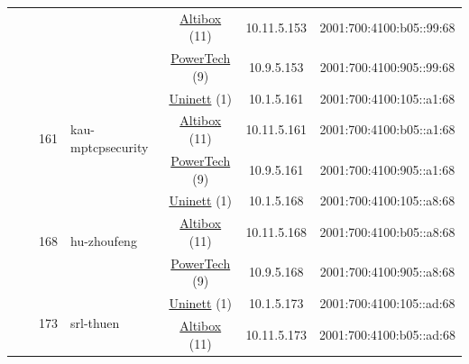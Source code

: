 \begin{small}
\begin{center}
\begin{longtable}{|c|c|c|c|c|c|c|c|}
  &  &  &  & \multicolumn{2}{|c|}{\tiny{\href{https://www.altibox.no}{Altibox} (11)}} & \tiny{10.11.5.153} & \tiny{2001:700:4100:b05::99:68} \\* \cline{5-5}\cline{6-6}\cline{7-7}\cline{8-8}
  &  &  &  & \multicolumn{2}{|c|}{\tiny{\href{http://www.powertech.no}{PowerTech} (9)}} & \tiny{10.9.5.153} & \tiny{2001:700:4100:905::99:68} \\* \cline{3-3}\cline{4-4}\cline{5-5}\cline{6-6}\cline{7-7}\cline{8-8}
  &  & \multirow{3}{*}{\tiny{161}} & \multicolumn{1}{|l|}{\multirow{3}{*}{\tiny{kau-mptcpsecurity}}} & \multicolumn{2}{|c|}{\tiny{\href{https://www.uninett.no}{Uninett} (1)}} & \tiny{10.1.5.161} & \tiny{2001:700:4100:105::a1:68} \\* \cline{5-5}\cline{6-6}\cline{7-7}\cline{8-8}
  &  &  &  & \multicolumn{2}{|c|}{\tiny{\href{https://www.altibox.no}{Altibox} (11)}} & \tiny{10.11.5.161} & \tiny{2001:700:4100:b05::a1:68} \\* \cline{5-5}\cline{6-6}\cline{7-7}\cline{8-8}
  &  &  &  & \multicolumn{2}{|c|}{\tiny{\href{http://www.powertech.no}{PowerTech} (9)}} & \tiny{10.9.5.161} & \tiny{2001:700:4100:905::a1:68} \\* \cline{3-3}\cline{4-4}\cline{5-5}\cline{6-6}\cline{7-7}\cline{8-8}
  &  & \multirow{3}{*}{\tiny{168}} & \multicolumn{1}{|l|}{\multirow{3}{*}{\tiny{hu-zhoufeng}}} & \multicolumn{2}{|c|}{\tiny{\href{https://www.uninett.no}{Uninett} (1)}} & \tiny{10.1.5.168} & \tiny{2001:700:4100:105::a8:68} \\* \cline{5-5}\cline{6-6}\cline{7-7}\cline{8-8}
  &  &  &  & \multicolumn{2}{|c|}{\tiny{\href{https://www.altibox.no}{Altibox} (11)}} & \tiny{10.11.5.168} & \tiny{2001:700:4100:b05::a8:68} \\* \cline{5-5}\cline{6-6}\cline{7-7}\cline{8-8}
  &  &  &  & \multicolumn{2}{|c|}{\tiny{\href{http://www.powertech.no}{PowerTech} (9)}} & \tiny{10.9.5.168} & \tiny{2001:700:4100:905::a8:68} \\* \cline{3-3}\cline{4-4}\cline{5-5}\cline{6-6}\cline{7-7}\cline{8-8}
  &  & \multirow{3}{*}{\tiny{173}} & \multicolumn{1}{|l|}{\multirow{3}{*}{\tiny{srl-thuen}}} & \multicolumn{2}{|c|}{\tiny{\href{https://www.uninett.no}{Uninett} (1)}} & \tiny{10.1.5.173} & \tiny{2001:700:4100:105::ad:68} \\* \cline{5-5}\cline{6-6}\cline{7-7}\cline{8-8}
  &  &  &  & \multicolumn{2}{|c|}{\tiny{\href{https://www.altibox.no}{Altibox} (11)}} & \tiny{10.11.5.173} & \tiny{2001:700:4100:b05::ad:68} \\* \cline{5-5}\cline{6-6}\cline{7-7}\cline{8-8}

\end{longtable}
\end{center}
\end{small}
